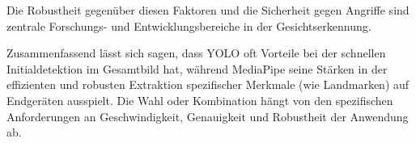 Die Robustheit gegenüber diesen Faktoren und die Sicherheit gegen Angriffe sind zentrale Forschungs- und Entwicklungsbereiche in der Gesichtserkennung.

Zusammenfassend lässt sich sagen, dass YOLO oft Vorteile bei der schnellen Initialdetektion im Gesamtbild hat, während MediaPipe seine Stärken in der effizienten und robusten Extraktion spezifischer Merkmale (wie Landmarken) auf Endgeräten ausspielt. Die Wahl oder Kombination hängt von den spezifischen Anforderungen an Geschwindigkeit, Genauigkeit und Robustheit der Anwendung ab.
